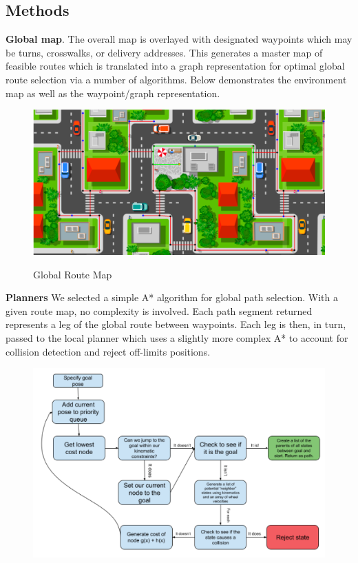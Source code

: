 \documentclass{article}
\begin{document}
\begin{multicols}{2}
\section*{Methods}
\noindent \textbf{Global map}.  The overall map is overlayed with designated waypoints which may be turns, crosswalks, or delivery addresses.  This generates a master map of feasible routes which is translated into a graph representation for optimal global route selection via a number of algorithms.  Below demonstrates the environment map as well as the waypoint/graph representation.\\
\begin{figure}[H]
   \centering
    \includegraphics[width = 1\columnwidth]{figures/routemap.png}
     \label{fig:routemap}
     \caption{Global Route Map}
\end{figure}
\noindent \textbf{Planners} We selected a simple A* algorithm for global path selection.  With a given route map, no complexity is involved.  Each path segment returned represents a leg of the global route between waypoints.  Each leg is then, in turn, passed to the local planner which uses a slightly more complex A* to account for collision detection and reject off-limits positions.
\begin{figure}[H]
   \centering
    \includegraphics[width = 1\columnwidth]{figures/astar.png}

\end{figure}
\end{multicols}
\end{document}

